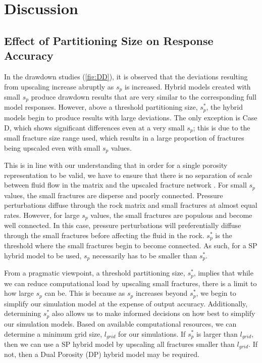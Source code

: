 \documentclass[a4paper]{article}
\begin{document}
\section{Discussion}
\subsection{Effect of Partitioning Size on Response Accuracy}
In the drawdown studies (\ref{fig:DD}), it is observed that the deviations resulting from upscaling increase abruptly as $s_p$ is increased. Hybrid models created with small $s_p$ produce drawdown results that are very similar to the corresponding full model responses. However, above a threshold partitioning size, $s_p^*$, the hybrid models begin to produce results with large deviations. The only exception is Case D, which shows significant differences even at a very small $s_p$; this is due to the small fracture size range used, which results in a large proportion of fractures being upscaled even with small $s_p$ values.

This is in line with our understanding that in order for a single porosity representation to be valid, we have to ensure that there is no separation of scale between fluid flow in the matrix and the upscaled fracture network \citep{Matthai2004a}. For small $s_p$ values, the small fractures are disperse and poorly connected. Pressure perturbations diffuse through the rock matrix and small fractures at almost equal rates. However, for large $s_p$ values, the small fractures are populous and become well connected. In this case, pressure perturbations will preferentially diffuse through the small fractures before affecting the fluid in the rock. $s_p^*$ is the threshold where the small fractures begin to become connected. As such, for a SP hybrid model to be used, $s_p$ necessarily has to be smaller than $s_p^*$.

From a pragmatic viewpoint, a threshold partitioning size, $s_p^*$, implies that while we can reduce computational load by upscaling small fractures, there is a limit to how large $s_p$ can be. This is because as $s_p$ increases beyond $s_p^*$, we begin to simplify our simulation model at the expense of output accuracy. Additionally, determining $s_p^*$ also allows us to make informed decisions on how best to simplify our simulation models. Based on available computational resources, we can determine a minimum grid size, $l_{grid}$ for our simulations. If $s_p^*$ is larger than $l_{grid}$, then we can use a SP hybrid model by upscaling all fractures smaller than $l_{grid}$. If not, then a Dual Porosity (DP) hybrid model may be required.
\end{document}
